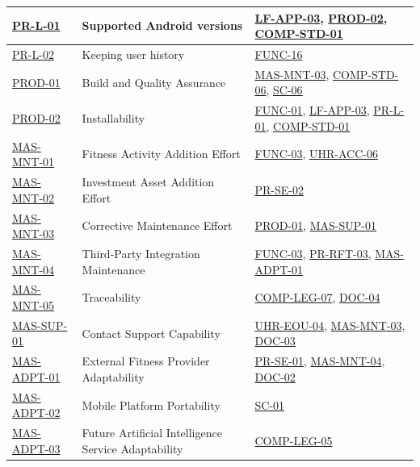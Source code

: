 \documentclass[12pt]{article}
\begin{document}
\begin{xltabular}{\textwidth}{|p{2.3cm}|p{4.2cm}|X|}
\hline
\hyperlink{req:PR-L-01}{PR-L-01} & Supported Android versions & \hyperlink{req:LF-APP-03}{LF-APP-03}, \hyperlink{req:PROD-02}{PROD-02}, \hyperlink{req:COMP-STD-01}{COMP-STD-01} \\
\hline
\hyperlink{req:PR-L-02}{PR-L-02} & Keeping user history & \hyperlink{req:FUNC-16}{FUNC-16} \\
\hline
\hyperlink{req:PROD-01}{PROD-01} & Build and Quality Assurance & \hyperlink{req:MAS-MNT-03}{MAS-MNT-03}, \hyperlink{req:COMP-STD-06}{COMP-STD-06}, \hyperlink{req:SC-06}{SC-06} \\
\hline
\hyperlink{req:PROD-02}{PROD-02} & Installability & \hyperlink{req:FUNC-01}{FUNC-01}, \hyperlink{req:LF-APP-03}{LF-APP-03}, \hyperlink{req:PR-L-01}{PR-L-01}, \hyperlink{req:COMP-STD-01}{COMP-STD-01} \\
\hline
\hyperlink{req:MAS-MNT-01}{MAS-MNT-01} & Fitness Activity Addition Effort & \hyperlink{req:FUNC-03}{FUNC-03}, \hyperlink{req:UHR-ACC-06}{UHR-ACC-06} \\
\hline
\hyperlink{req:MAS-MNT-02}{MAS-MNT-02} & Investment Asset Addition Effort & \hyperlink{req:PR-SE-02}{PR-SE-02} \\
\hline
\hyperlink{req:MAS-MNT-03}{MAS-MNT-03} & Corrective Maintenance Effort & \hyperlink{req:PROD-01}{PROD-01}, \hyperlink{req:MAS-SUP-01}{MAS-SUP-01} \\
\hline
\hyperlink{req:MAS-MNT-04}{MAS-MNT-04} & Third-Party Integration Maintenance & \hyperlink{req:FUNC-03}{FUNC-03}, \hyperlink{req:PR-RFT-03}{PR-RFT-03}, \hyperlink{req:MAS-ADPT-01}{MAS-ADPT-01} \\
\hline
\hyperlink{req:MAS-MNT-05}{MAS-MNT-05} & Traceability & \hyperlink{req:COMP-LEG-07}{COMP-LEG-07}, \hyperlink{req:DOC-04}{DOC-04} \\
\hline
\hyperlink{req:MAS-SUP-01}{MAS-SUP-01} & Contact Support Capability & \hyperlink{req:UHR-EOU-04}{UHR-EOU-04}, \hyperlink{req:MAS-MNT-03}{MAS-MNT-03}, \hyperlink{req:DOC-03}{DOC-03} \\
\hline
\hyperlink{req:MAS-ADPT-01}{MAS-ADPT-01} & External Fitness Provider Adaptability & \hyperlink{req:PR-SE-01}{PR-SE-01}, \hyperlink{req:MAS-MNT-04}{MAS-MNT-04}, \hyperlink{req:DOC-02}{DOC-02} \\
\hline
\hyperlink{req:MAS-ADPT-02}{MAS-ADPT-02} & Mobile Platform Portability & \hyperlink{req:SC-01}{SC-01} \\
\hline
\hyperlink{req:MAS-ADPT-03}{MAS-ADPT-03} & Future Artificial Intelligence Service Adaptability & \hyperlink{req:COMP-LEG-05}{COMP-LEG-05} \\

\end{xltabular}
\end{document}
